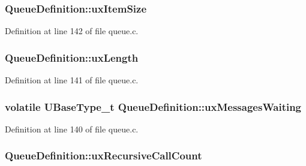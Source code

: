 \subsubsection[{\texorpdfstring{ux\+Item\+Size}{uxItemSize}}]{ Queue\+Definition\+::ux\+Item\+Size}\hypertarget{struct_queue_definition_a81bb7d3826909244baa9debf5a55abb0}{}\label{struct_queue_definition_a81bb7d3826909244baa9debf5a55abb0}


Definition at line 142 of file queue.\+c.

\subsubsection[{\texorpdfstring{ux\+Length}{uxLength}}]{ Queue\+Definition\+::ux\+Length}\hypertarget{struct_queue_definition_ae80d17a812c669d4d41265b7f693988c}{}\label{struct_queue_definition_ae80d17a812c669d4d41265b7f693988c}


Definition at line 141 of file queue.\+c.

\subsubsection[{\texorpdfstring{ux\+Messages\+Waiting}{uxMessagesWaiting}}]{\setlength{\rightskip}{0pt plus 5cm}volatile {\bf U\+Base\+Type\+\_\+t} Queue\+Definition\+::ux\+Messages\+Waiting}\hypertarget{struct_queue_definition_a12b07a40152d0f21488ca06d362d13d1}{}\label{struct_queue_definition_a12b07a40152d0f21488ca06d362d13d1}


Definition at line 140 of file queue.\+c.

\subsubsection[{\texorpdfstring{ux\+Recursive\+Call\+Count}{uxRecursiveCallCount}}]{ Queue\+Definition\+::ux\+Recursive\+Call\+Count}\hypertarget{struct_queue_definition_a2cf88e286477f6f89fe1009d722dc4cf}{}\label{struct_queue_definition_a2cf88e286477f6f89fe1009d722dc4cf}



